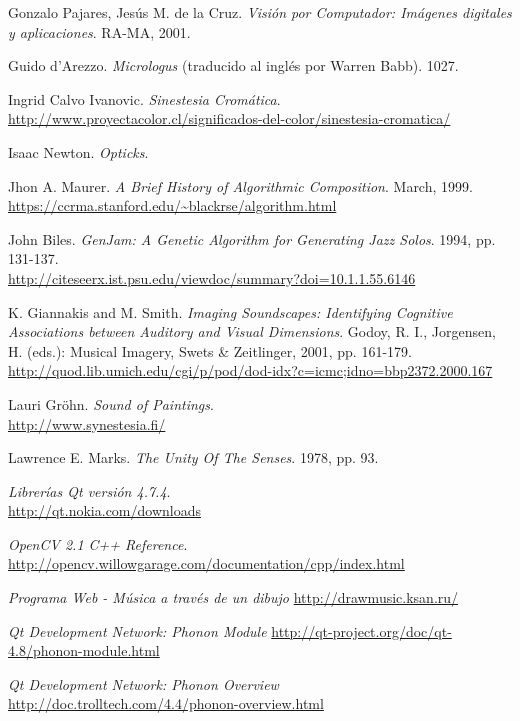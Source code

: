 \begin{thebibliography}{9}
 Gonzalo Pajares, Jesús M. de la Cruz. \emph{Visión por Computador: Imágenes digitales y aplicaciones}. RA-MA, 2001.

 Guido d'Arezzo. \emph{Micrologus} (traducido al inglés por Warren Babb). 1027.

 Ingrid Calvo Ivanovic. \emph{Sinestesia Cromática}.
 \url{http://www.proyectacolor.cl/significados-del-color/sinestesia-cromatica/}

 Isaac Newton. \emph{Opticks}.

 Jhon A. Maurer. \emph{A Brief History of Algorithmic Composition}. March, 1999.
 \url{https://ccrma.stanford.edu/~blackrse/algorithm.html}

 John Biles. \emph{GenJam: A Genetic Algorithm for Generating Jazz Solos}. 1994, pp. 131-137.\\
 \url{http://citeseerx.ist.psu.edu/viewdoc/summary?doi=10.1.1.55.6146}

 K. Giannakis and M. Smith. \emph{Imaging Soundscapes: Identifying Cognitive Associations between Auditory and Visual Dimensions}. Godoy, R. I., Jorgensen, H. (eds.): Musical Imagery, Swets \& Zeitlinger, 2001, pp. 161-179.\\
 \url{http://quod.lib.umich.edu/cgi/p/pod/dod-idx?c=icmc;idno=bbp2372.2000.167}

Lauri Gröhn. \emph{Sound of Paintings}.\\
\url{http://www.synestesia.fi/}

 Lawrence E. Marks. \emph{The Unity Of The Senses}. 1978, pp. 93.

  \emph{Librerías Qt versión 4.7.4}.\\
  \url{http://qt.nokia.com/downloads}

  \emph{OpenCV 2.1 C++ Reference}.\\
  \url{http://opencv.willowgarage.com/documentation/cpp/index.html}

\emph{Programa Web - Música a través de un dibujo}
\url{http://drawmusic.ksan.ru/}

 \emph{Qt Development Network: Phonon Module}
 \url{http://qt-project.org/doc/qt-4.8/phonon-module.html}
 
 \emph{Qt Development Network: Phonon Overview}
 \url{http://doc.trolltech.com/4.4/phonon-overview.html}


\end{thebibliography}
